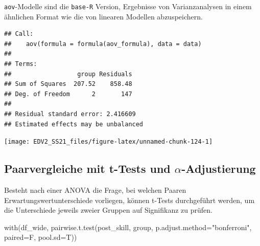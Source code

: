 \documentclass[
]{book}
\newenvironment{Shaded}{\begin{snugshade}}{\end{snugshade}}
\newcommand{\AttributeTok}[1]{\textcolor[rgb]{0.77,0.63,0.00}{#1}}
\newcommand{\FunctionTok}[1]{\textcolor[rgb]{0.00,0.00,0.00}{#1}}
\newcommand{\NormalTok}[1]{#1}
\newcommand{\OtherTok}[1]{\textcolor[rgb]{0.56,0.35,0.01}{#1}}
\newcommand{\SpecialCharTok}[1]{\textcolor[rgb]{0.00,0.00,0.00}{#1}}
\newcommand{\StringTok}[1]{\textcolor[rgb]{0.31,0.60,0.02}{#1}}
\begin{document}
\texttt{aov}-Modelle sind die \texttt{base-R} Version, Ergebnisse von Varianzanalysen in einem ähnlichen Format wie die von linearen Modellen abzuspeichern.

\begin{Shaded}
\end{Shaded}

\begin{verbatim}
## Call:
##    aov(formula = formula(aov_formula), data = data)
## 
## Terms:
##                  group Residuals
## Sum of Squares  207.52    858.48
## Deg. of Freedom      2       147
## 
## Residual standard error: 2.416609
## Estimated effects may be unbalanced
\end{verbatim}

\begin{center}\texttt{[image: EDV2\_SS21\_files/figure-latex/unnamed-chunk-124-1]} \end{center}

\hypertarget{paarvergleiche-mit-t-tests-und-alpha-adjustierung}{%
\subsection{\texorpdfstring{Paarvergleiche mit t-Tests und \(\alpha\)-Adjustierung}{Paarvergleiche mit t-Tests und \textbackslash alpha-Adjustierung}}\label{paarvergleiche-mit-t-tests-und-alpha-adjustierung}}

Besteht nach einer ANOVA die Frage, bei welchen Paaren Erwartungswertunterschiede vorliegen, können
t-Tests durchgeführt werden, um die Unterschiede jeweils zweier Gruppen auf Signifikanz zu prüfen.

\begin{Shaded}
\begin{Highlighting}[]
\FunctionTok{with}\NormalTok{(df\_wide, }\FunctionTok{pairwise.t.test}\NormalTok{(post\_skill, group,}
                           \AttributeTok{p.adjust.method=}\StringTok{"bonferroni"}\NormalTok{, }\AttributeTok{paired=}\NormalTok{F, }\AttributeTok{pool.sd=}\NormalTok{T))}
\end{Highlighting}
\end{Shaded}
\end{document}
